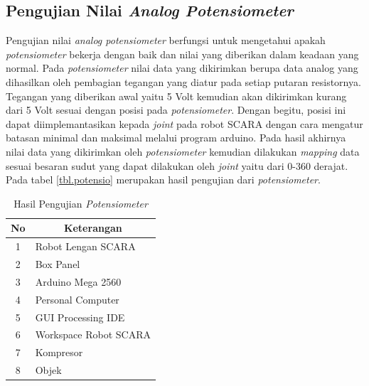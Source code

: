 \subsection{Pengujian Nilai\textit{ Analog Potensiometer}}
Pengujian nilai \textit{analog potensiometer} berfungsi untuk mengetahui apakah \textit{potensiometer} bekerja dengan baik dan nilai yang diberikan dalam keadaan yang normal. Pada \textit{potensiometer} nilai data yang dikirimkan berupa data analog yang dihasilkan oleh pembagian tegangan yang diatur pada setiap putaran resistornya. Tegangan yang diberikan awal yaitu 5 Volt kemudian akan dikirimkan kurang dari 5 Volt sesuai dengan posisi pada \textit{potensiometer}. Dengan begitu, posisi ini dapat diimplemantasikan kepada \textit{joint} pada robot SCARA dengan cara mengatur batasan minimal dan maksimal melalui program arduino. Pada hasil akhirnya nilai data yang dikirimkan oleh \textit{potensiometer} kemudian dilakukan \textit{mapping} data sesuai besaran sudut yang dapat dilakukan oleh \textit{joint} yaitu dari 0-360 derajat. Pada tabel \ref{tbl.potensio}  merupakan hasil pengujian dari \textit{potensiometer}.

\begin{table}[H]
	\centering
	\caption{Hasil Pengujian \textit{Potensiometer}}
	\label{tbl.potensiometer}
	\begin{tabular}{|c|l|}
		\hline
		\rowcolor[HTML]{9B9B9B} 
		
		No & \multicolumn{1}{c|}{\cellcolor[HTML]{9B9B9B}Keterangan} \\ \hline
		1  & Robot Lengan SCARA                                      \\ \hline
		2  & Box Panel                                               \\ \hline
		3  & Arduino Mega 2560                                       \\ \hline
		4  & Personal Computer                                       \\ \hline
		5  & GUI Processing IDE                                      \\ \hline
		6  & Workspace Robot SCARA                                   \\ \hline
		7  & Kompresor                                               \\ \hline
		8  & Objek                                                   \\ \hline
	\end{tabular}
	
\end{table} 

